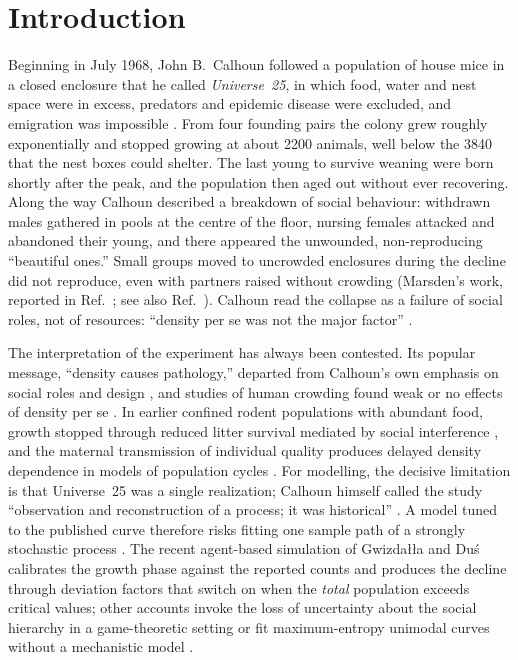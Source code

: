 \section{Introduction}
\label{sec:intro}

Beginning in July 1968, John B.~Calhoun followed a population of house mice in a closed enclosure that he called
\emph{Universe~25}, in which food, water and nest space were in excess, predators and epidemic disease were
excluded, and emigration was impossible \cite{Calhoun1973}. From four founding pairs the colony grew roughly
exponentially and stopped growing at about 2200 animals, well below the 3840 that the nest boxes could shelter. The
last young to survive weaning were born shortly after the peak, and the population then aged out without ever
recovering. Along the way Calhoun described a breakdown of social behaviour: withdrawn males gathered in pools at
the centre of the floor, nursing females attacked and abandoned their young, and there appeared the unwounded,
non-reproducing ``beautiful ones.'' Small groups moved to uncrowded enclosures during the decline did not reproduce,
even with partners raised without crowding (Marsden's work, reported in Ref.~\cite{Calhoun1973}; see also
Ref.~\cite{Marsden1972}). Calhoun read the collapse as a failure of social roles, not of resources: ``density per se was not the major factor'' \cite{Calhoun1973}.

The interpretation of the experiment has always been contested. Its popular message, ``density causes pathology,''
departed from Calhoun's own emphasis on social roles and design \cite{RamsdenAdams2009,Ramsden2009,AdamsRamsden2024},
and studies of human crowding found weak or no effects of density per se \cite{Galle1972,Freedman1975}. In earlier
confined rodent populations with abundant food, growth stopped through reduced litter survival mediated by social
interference \cite{Southwick1955,Lidicker1965}, and the maternal transmission of individual quality produces
delayed density dependence in models of population cycles \cite{GinzburgTaneyhill1994,InchaustiGinzburg1998}. For modelling, the decisive limitation is
that Universe~25 was a single realization; Calhoun himself called the study ``observation and reconstruction of a
process; it was historical'' \cite{Calhoun1973}. A model tuned to the published curve therefore risks fitting one
sample path of a strongly stochastic process \cite{GwizdallaDus2026}. The recent agent-based simulation of
Gwizdałła and Duś \cite{GwizdallaDus2026} calibrates the growth phase against
the reported counts and produces the decline through deviation factors that switch on when the \emph{total}
population exceeds critical values; other accounts invoke the loss of uncertainty about the social hierarchy in a
game-theoretic setting \cite{Mantzaris2025} or fit maximum-entropy unimodal curves without a mechanistic model
\cite{Roman2025}.

